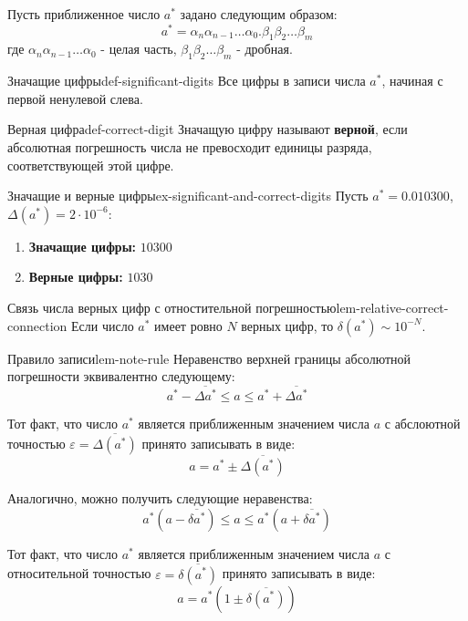 \documentclass[14pt]{extarticle}
\begin{document}
        Пусть приближенное число $a^{*}$ задано следующим образом:
        $$a^{*} = \alpha_{n}\alpha_{n-1}\ldots\alpha_{0}.\beta_{1}\beta_{2}\ldots\beta_{m}$$
        где $\alpha_{n}\alpha_{n-1}\ldots\alpha_{0}$ - целая часть, $\beta_{1}\beta_{2}\ldots\beta_{m}$ - дробная.

        \begin{definition}{Значащие цифры}{def-significant-digits}
            Все цифры в записи числа $a^{*}$, начиная с первой ненулевой слева.
        \end{definition}

        \begin{definition}{Верная цифра}{def-correct-digit}
            Значащую цифру называют \textbf{верной}, если абсолютная погрешность числа не превосходит единицы разряда, соответствующей этой цифре.
        \end{definition}

        \begin{example}{Значащие и верные цифры}{ex-significant-and-correct-digits}
            Пусть $a^{*} = 0.010300$, $\Delta(a^{*}) = 2 \cdot 10^{-6}$:
            
            \begin{enumerate}
                \item \textbf{Значащие цифры:} $10300$
                \item \textbf{Верные цифры:} $1030$
            \end{enumerate}
        \end{example}

        \begin{lemma}{Связь числа верных цифр с отностительной погрешностью}{lem-relative-correct-connection}
            Если число $a^{*}$ имеет ровно $N$ верных цифр, то $\delta(a^{*}) \sim 10^{-N}$.
        \end{lemma}

        \begin{lemma}{Правило записи}{lem-note-rule}
            Неравенство верхней границы абсолютной погрешности эквивалентно следующему:
            $$a^{*} - \overline{\Delta{a^{*}}} \leq a \leq a^{*} + \overline{\Delta{a^{*}}}$$
            
            Тот факт, что число $a^{*}$ является приближенным значением числа $a$ с абслоютной точностью $\varepsilon = \overline{\Delta(a^{*})}$ принято записывать в виде:
            $$a = a^{*} \pm \overline{\Delta(a^{*})}$$
        
            Аналогично, можно получить следующие неравенства:
            $$a^{*}(a - \overline{\delta{a^{*}}}) \leq a \leq a^{*}(a + \overline{\delta{a^{*}}})$$
            
            Тот факт, что число $a^{*}$ является приближенным значением числа $a$ с относительной точностью $\varepsilon = \overline{\delta(a^{*})}$ принято записывать в виде:
            $$a = a^{*}(1 \pm \overline{\delta(a^{*})})$$
        \end{lemma}
\end{document}
